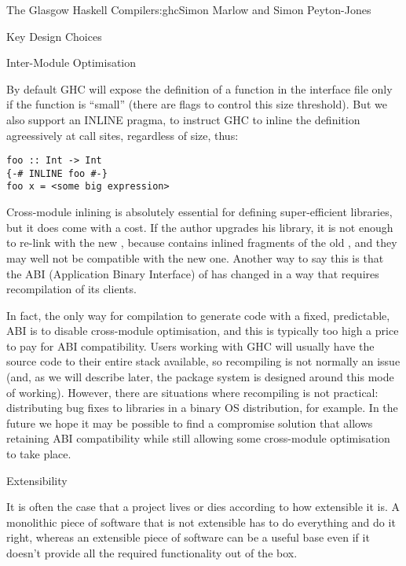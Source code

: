 \begin{aosachapter}{The Glasgow Haskell Compiler}{s:ghc}{Simon Marlow and Simon Peyton-Jones}
\begin{aosasect1}{Key Design Choices}
\begin{aosasect2}{Inter-Module Optimisation}
\begin{aosaitemize}
\end{aosaitemize}

By default GHC will expose the definition of a function in the
interface file only if the function is ``small'' (there are flags to
control this size threshold).  But we also support an INLINE pragma,
to instruct GHC to inline the definition agreessively at call sites,
regardless of size, thus:

\begin{verbatim}
foo :: Int -> Int 
{-# INLINE foo #-}
foo x = <some big expression>
\end{verbatim}

Cross-module inlining is absolutely essential for defining
super-efficient libraries, but it does come with a cost.  If the
author upgrades his library, it is not enough to re-link
 with the new , because 
contains inlined fragments of the old , and they may well
not be compatible with the new one.  Another way to say this is that
the ABI (Application Binary Interface) of  has changed in
a way that requires recompilation of its clients.

In fact, the only way for compilation to generate code with a fixed,
predictable, ABI is to disable cross-module optimisation, and this is
typically too high a price to pay for ABI compatibility.  Users
working with GHC will usually have the source code to their entire
stack available, so recompiling is not normally an issue (and, as we
will describe later, the package system is designed around this mode
of working).  However, there are situations where recompiling is not
practical: distributing bug fixes to libraries in a binary OS
distribution, for example.  In the future we hope it may be possible
to find a compromise solution that allows retaining ABI compatibility
while still allowing some cross-module optimisation to take place.

\end{aosasect2}

\end{aosasect1}

\begin{aosasect1}{Extensibility}

It is often the case that a project lives or dies according to how
extensible it is.  A monolithic piece of software that is not
extensible has to do everything and do it right, whereas an extensible
piece of software can be a useful base even if it doesn't provide all
the required functionality out of the box.


\end{aosasect1}
\end{aosachapter}
